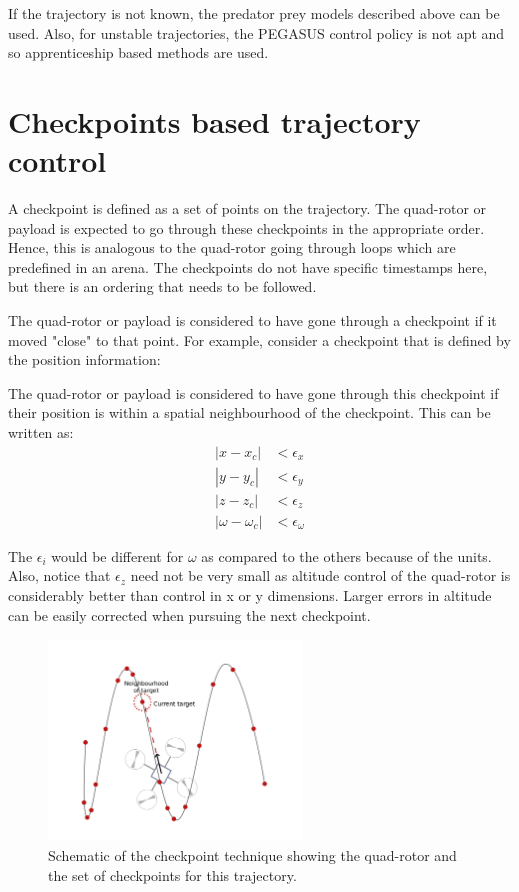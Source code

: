 \documentclass[hidelinks,BTech]{iitmdiss}
\begin{document}
If the trajectory is not known, the predator prey models described above can be used. Also, for unstable trajectories, the PEGASUS control policy is not apt and so apprenticeship based methods are used.

\section{Checkpoints based trajectory control}

A checkpoint is defined as a set of points on the trajectory. The quad-rotor or payload is expected to go through these checkpoints in the appropriate order. Hence, this is analogous to the quad-rotor going through loops which are predefined in an arena. The checkpoints do not have specific timestamps here, but there is an ordering that needs to be followed.

The quad-rotor or payload is considered to have gone through a checkpoint if it moved "close" to that point. For example, consider a checkpoint that is defined by the position information:
\begin{equation}
  [x_c, y_c, z_y, \omega_c]
\end{equation}

The quad-rotor or payload is considered to have gone through this checkpoint if their position is within a spatial neighbourhood of the checkpoint. This can be written as:
\begin{equation} \begin{split}
  |x - x_c| &< \epsilon_x \\
  |y - y_c| &< \epsilon_y \\
  |z - z_c| &< \epsilon_z \\
  |\omega - \omega_c| &< \epsilon_\omega
\end{split} \end{equation}

The $\epsilon_i$ would be different for $\omega$ as compared to the others because of the units. Also, notice that $\epsilon_z$ need not be very small as altitude control of the quad-rotor is considerably better than control in x or y dimensions. Larger errors in altitude can be easily corrected when pursuing the next checkpoint.

\begin{figure}[H]
  \centering
    \includegraphics[width=0.6\textwidth]{checkpoint.png}
    \caption{Schematic of the checkpoint technique showing the quad-rotor and the set of checkpoints for this trajectory.}
\end{figure}
\end{document}
